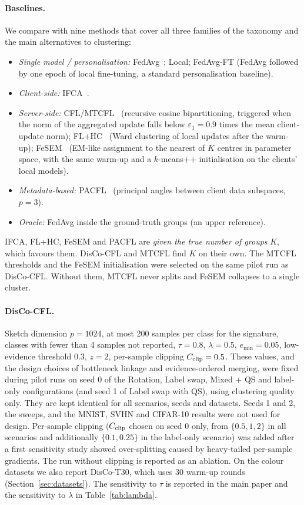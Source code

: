 \paragraph{Baselines.} We compare with nine methods that cover all three families of the taxonomy and the main alternatives to clustering:
\begin{itemize}[leftmargin=*,itemsep=1pt]
\item \emph{Single model / personalisation:} FedAvg~\citep{mcmahan2017fedavg}; Local; FedAvg-FT (FedAvg followed by one epoch of local fine-tuning, a standard personalisation baseline).
\item \emph{Client-side:} IFCA~\citep{ghosh2020ifca}.
\item \emph{Server-side:} CFL/MTCFL~\citep{sattler2021cfl} (recursive cosine bipartitioning, triggered when the norm of the aggregated update falls below $\varepsilon_1=0.9$ times the mean client-update norm); FL+HC~\citep{briggs2020flhc} (Ward clustering of local updates after the warm-up); FeSEM~\citep{long2023fesem} (EM-like assignment to the nearest of $K$ centres in parameter space, with the same warm-up and a $k$-means++ initialisation on the clients' local models).
\item \emph{Metadata-based:} PACFL~\citep{vahidian2023pacfl} (principal angles between client data subspaces, $p=3$).
\item \emph{Oracle:} FedAvg inside the ground-truth groups (an upper reference).
\end{itemize}
IFCA, FL+HC, FeSEM and PACFL are \emph{given the true number of groups} $K$, which favours them. DisCo-CFL and MTCFL find $K$ on their own. The MTCFL thresholds and the FeSEM initialisation were selected on the same pilot run as DisCo-CFL. Without them, MTCFL never splits and FeSEM collapses to a single cluster.

\paragraph{DisCo-CFL.} Sketch dimension $p=1024$, at most 200 samples per class for the signature, classes with fewer than 4 samples not reported, $\tau=0.8$, $\lambda=0.5$, $e_{\min}=0.05$, low-evidence threshold $0.3$, $z=2$, per-sample clipping $C_{\rm clip}=0.5$. These values, and the design choices of bottleneck linkage and evidence-ordered merging, were fixed during pilot runs on seed 0 of the Rotation, Label swap, Mixed + QS and label-only configurations (and seed 1 of Label swap with QS), using clustering quality only. They are kept identical for all scenarios, seeds and datasets. Seeds 1 and 2, the sweeps, and the MNIST, SVHN and CIFAR-10 results were not used for design. Per-sample clipping ($C_{\rm clip}$ chosen on seed 0 only, from $\{0.5,1,2\}$ in all scenarios and additionally $\{0.1,0.25\}$ in the label-only scenario) was added after a first sensitivity study showed over-splitting caused by heavy-tailed per-sample gradients. The run without clipping is reported as an ablation. On the colour datasets we also report DisCo-T30, which uses 30 warm-up rounds (Section~\ref{sec:datasets}). The sensitivity to $\tau$ is reported in the main paper and the sensitivity to $\lambda$ in Table~\ref{tab:lambda}.

